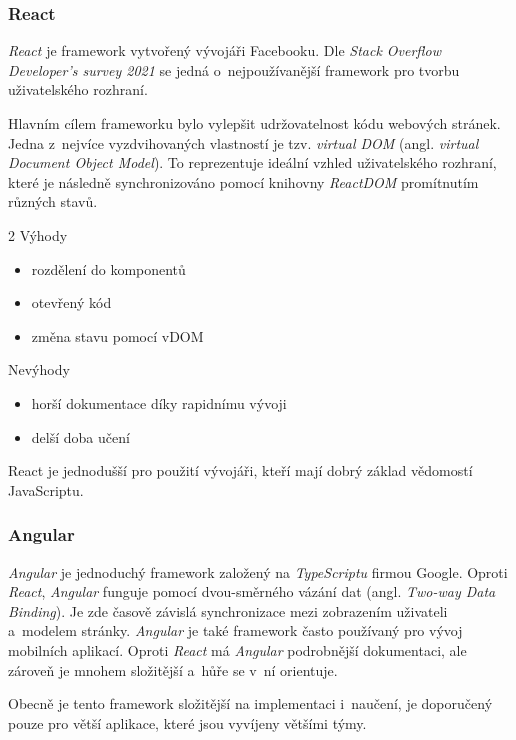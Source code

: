 \subsubsection{React}
\emph{React} je framework vytvořený vývojáři Facebooku. Dle \emph{Stack Overflow Developer's survey 2021} se jedná o~nejpoužívanější framework pro tvorbu uživatelského rozhraní. \cite{mostusedfrontend} 

Hlavním cílem frameworku bylo vylepšit udržovatelnost kódu webových stránek. Jedna z~nejvíce vyzdvihovaných vlastností je tzv. \emph{virtual DOM} (angl. \emph{virtual Document Object Model}). To reprezentuje ideální vzhled uživatelského rozhraní, které je následně synchronizováno pomocí knihovny \emph{ReactDOM} promítnutím různých stavů.~\cite{react}
\begin{multicols}{2}
    Výhody
    \begin{itemize}
        \item rozdělení do komponentů
        \item otevřený kód 
        \item změna stavu pomocí vDOM
    \end{itemize}
    \columnbreak
    Nevýhody
    \begin{itemize}
        \item horší dokumentace díky rapidnímu vývoji
        \item delší doba učení
    \end{itemize}
\end{multicols}
\noindent
React je jednodušší pro použití vývojáři, kteří mají dobrý základ vědomostí JavaScriptu.~\cite{bestfrontend}
\subsubsection{Angular}
\emph{Angular} je jednoduchý framework založený na \emph{TypeScriptu} firmou Google. Oproti \emph{React}, \emph{Angular} funguje pomocí dvou-směrného vázání dat (angl. \emph{Two-way Data Binding}). Je zde časově závislá synchronizace mezi zobrazením uživateli a~modelem stránky. \emph{Angular} je také framework často používaný pro vývoj mobilních aplikací. Oproti \emph{React} má \emph{Angular} podrobnější dokumentaci, ale zároveň je mnohem složitější a~hůře se v~ní orientuje. 

Obecně je tento framework složitější na implementaci i~naučení, je doporučený pouze pro větší aplikace, které jsou vyvíjeny většími týmy.~\cite{bestfrontend}
